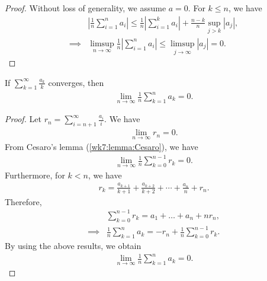 \documentclass[12pt]{article}
\begin{document}
\begin{proof}
Without loss of generality, we assume $a = 0$. For $k \leq n$, we have
\begin{align*}
&\left| \frac{1}{n} \sum_{i=1}^n a_i\right|
\leq \frac{1}{n} \left|\sum_{i=1}^k a_i\right| + \frac{n-k}{n} \sup_{j>k} |a_j|, \\
\implies
&\limsup_{n \to \infty}\frac{1}{n} \left|\sum_{i=1}^n a_i\right| \leq \limsup_{j \to \infty} |a_j| = 0.
\end{align*}
\end{proof}
%
\begin{Lemma} \label{wk7:lemma:Kronecker}
If $\displaystyle\sum_{k = 1}^{\infty} \frac{a_k}{k}$ converges, then 
\begin{align*}
\lim_{n \to \infty} \frac{1}{n} \sum_{k = 1}^{n} a_k = 0.
\end{align*}
\end{Lemma}
%
\begin{proof}
Let $r_n = \displaystyle\sum_{i = n+1}^{\infty} \frac{a_i}{i}$. We have
\begin{align*}
\lim_{n \to \infty} r_n = 0.
\end{align*}
From Cesaro's lemma (\cref{wk7:lemma:Cesaro}), we have
\begin{align*}
\lim_{n \to \infty} \frac{1}{n} \sum_{k=0}^{n-1} r_k = 0.
\end{align*}
Furthermore, for $k<n$, we have
\begin{align*}
r_k = \frac{a_{k+1}}{k+1} + \frac{a_{k+2}}{k+2} + \cdots + \frac{a_{n}}{n} + r_n.
\end{align*}
Therefore,
\begin{align*}
&\sum_{k=0}^{n-1} r_k = a_1 + \ldots + a_n + n r_n, \\
\implies
&\frac{1}{n} \sum_{k=1}^{n} a_k = -r_n + \frac{1}{n} \sum_{k=0}^{n-1} r_k.
\end{align*}
By using the above results, we obtain
\begin{align*}
\lim_{n \to \infty} \frac{1}{n} \sum_{k=1}^{n} a_k = 0.
\end{align*}
\end{proof}
%
\end{document}
